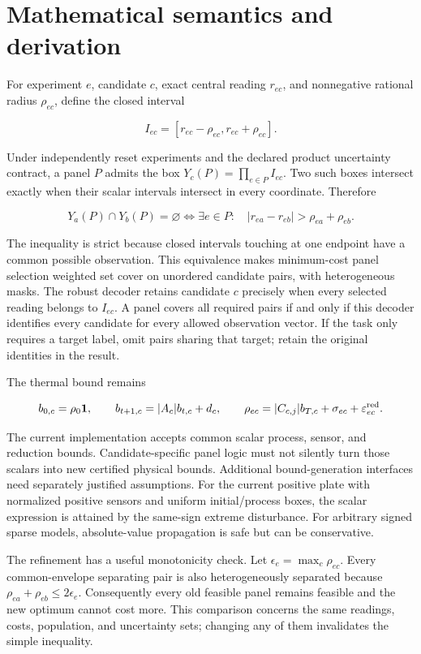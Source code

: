 \documentclass[
  11pt,
  a4paper,
]{report}
\begin{document}
\hypertarget{mathematical-semantics-and-derivation}{%
\section{Mathematical semantics and
derivation}\label{mathematical-semantics-and-derivation}}

For experiment \(e\), candidate \(c\), exact central reading \(r_{ec}\),
and nonnegative rational radius \(\rho_{ec}\), define the closed
interval

\[
I_{ec}=[r_{ec}-\rho_{ec},r_{ec}+\rho_{ec}].
\]

Under independently reset experiments and the declared product
uncertainty contract, a panel \(P\) admits the box
\(Y_c(P)=\prod_{e\in P}I_{ec}\). Two such boxes intersect exactly when
their scalar intervals intersect in every coordinate. Therefore

\[
Y_a(P)\cap Y_b(P)=\varnothing
\iff \exists e\in P:\quad
|r_{ea}-r_{eb}|>\rho_{ea}+\rho_{eb}.
\]

The inequality is strict because closed intervals touching at one
endpoint have a common possible observation. This equivalence makes
minimum-cost panel selection weighted set cover on unordered candidate
pairs, with heterogeneous masks. The robust decoder retains candidate
\(c\) precisely when every selected reading belongs to \(I_{ec}\). A
panel covers all required pairs if and only if this decoder identifies
every candidate for every allowed observation vector. If the task only
requires a target label, omit pairs sharing that target; retain the
original identities in the result.

The thermal bound remains

\[
b_{0,c}=\rho_0\mathbf1,\qquad
b_{t+1,c}=|A_c|b_{t,c}+d_c,\qquad
\rho_{ec}=|C_{c,j}|b_{T,c}+\sigma_{ec}+\varepsilon_{ec}^{\rm red}.
\]

The current implementation accepts common scalar process, sensor, and
reduction bounds. Candidate-specific panel logic must not silently turn
those scalars into new certified physical bounds. Additional
bound-generation interfaces need separately justified assumptions. For
the current positive plate with normalized positive sensors and uniform
initial/process boxes, the scalar expression is attained by the
same-sign extreme disturbance. For arbitrary signed sparse models,
absolute-value propagation is safe but can be conservative.

The refinement has a useful monotonicity check. Let
\(\epsilon_e=\max_c\rho_{ec}\). Every common-envelope separating pair is
also heterogeneously separated because
\(\rho_{ea}+\rho_{eb}\le2\epsilon_e\). Consequently every old feasible
panel remains feasible and the new optimum cannot cost more. This
comparison concerns the same readings, costs, population, and
uncertainty sets; changing any of them invalidates the simple
inequality.
\end{document}
